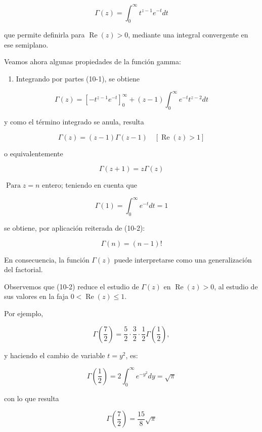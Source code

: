 \documentclass[10pt]{article}
\theoremstyle{plain}
\theoremstyle{definition}
\theoremstyle{remark}
\begin{document}
\begin{equation*}
\Gamma(z)=\int_{0}^{\infty} t^{z-1} e^{-t} d t \tag{10-1}
\end{equation*}


que permite definirla para $\operatorname{Re}(z)>0$, mediante una integral convergente en ese semiplano.

Veamos ahora algunas propiedades de la función gamma:

\begin{enumerate}
  \item Integrando por partes (10-1), se obtiene
\end{enumerate}

$$
\Gamma(z)=\left[-t^{z-1} e^{-t}\right]_{0}^{\infty}+(z-1) \int_{0}^{\infty} e^{-t} t^{z-2} d t
$$

y como el término integrado se anula, resulta

$$
\Gamma(z)=(z-1) \Gamma(z-1) \quad[\operatorname{Re}(z)>1]
$$

o equivalentemente


\begin{equation*}
\Gamma(z+1)=z \Gamma(z) \tag{Re}
\end{equation*}


$\operatorname{Para} z=n$ entero; teniendo en cuenta que

$$
\Gamma(1)=\int_{0}^{\infty} e^{-t} d t=1
$$

se obtiene, por aplicación reiterada de (10-2):

$$
\Gamma(n)=(n-1)!
$$

En consecuencia, la función $\Gamma(z)$ puede interpretarse como una generalización del factorial.

Observemos que (10-2) reduce el estudio de $\Gamma(z)$ en $\operatorname{Re}(z)>0$, al estudio de sus valores en la faja $0<\operatorname{Re}(z) \leqslant 1$.


Por ejemplo,

$$
\Gamma\left(\frac{7}{2}\right)=\frac{5}{2} \cdot \frac{3}{2} \cdot \frac{1}{2} \Gamma\left(\frac{1}{2}\right),
$$

y haciendo el cambio de variable $t=y^{2}$, es:


\begin{equation*}
\Gamma\left(\frac{1}{2}\right)=2 \int_{0}^{\infty} e^{-y^{2}} d y=\sqrt{\pi} \tag{10-3}
\end{equation*}


con lo que resulta

$$
\Gamma\left(\frac{7}{2}\right)=\frac{15}{8} \sqrt{\pi}
$$
\end{document}
